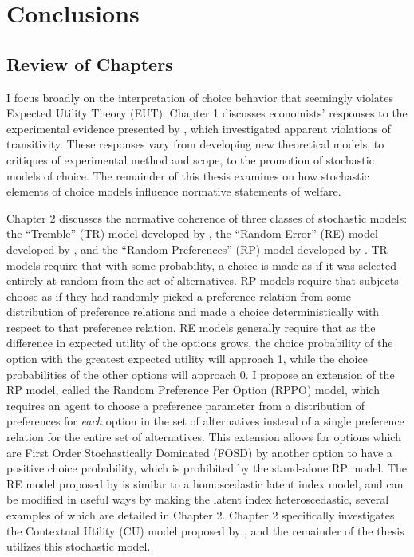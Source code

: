 \documentclass[../main.tex]{subfiles}
\begin{document}
\doublespacing
\setcounter{chapter}{4}

\chapter{Conclusions}


\section{Review of Chapters}

I focus broadly on the interpretation of choice behavior that seemingly violates Expected Utility Theory (EUT).
Chapter 1 discusses economists' responses to the experimental evidence presented by \textcite{Grether1979}, which investigated apparent violations of transitivity.
These responses vary from developing new theoretical models, to critiques of experimental method and scope, to the promotion of stochastic models of choice.
The remainder of this thesis examines on how stochastic elements of choice models influence normative statements of welfare.

Chapter 2 discusses the normative coherence of three classes of stochastic models: the \enquote{Tremble} (TR) model developed by \textcite{Harless1994}, the \enquote{Random Error} (RE) model developed by \textcite{Hey1994}, and the \enquote{Random Preferences} (RP) model developed by \textcite{Loomes1998}.
TR models require that with some probability, a choice is made as if it was selected entirely at random from the set of alternatives.
RP models require that subjects choose as if they had randomly picked a preference relation from some distribution of preference relations and made a choice deterministically with respect to that preference relation.
RE models generally require that as the difference in expected utility of the options grows, the choice probability of the option with the greatest expected utility will approach 1, while the choice probabilities of the other options will approach 0.{\footnotemark}
I propose an extension of the RP model, called the Random Preference Per Option (RPPO) model, which requires an agent to choose a preference parameter from a distribution of preferences for \textit{each} option in the set of alternatives instead of a single preference relation for the entire set of alternatives.
This extension allows for options which are First Order Stochastically Dominated (FOSD) by another option to have a positive choice probability, which is prohibited by the stand-alone RP model.
The RE model proposed by \textcite{Hey1994} is similar to a homoscedastic latent index model, and can be modified in useful ways by making the latent index heteroscedastic, several examples of which are detailed in Chapter 2.
Chapter 2 specifically investigates the Contextual Utility (CU) model proposed by \textcite{Wilcox2008}, and the remainder of the thesis utilizes this stochastic model.
\end{document}
